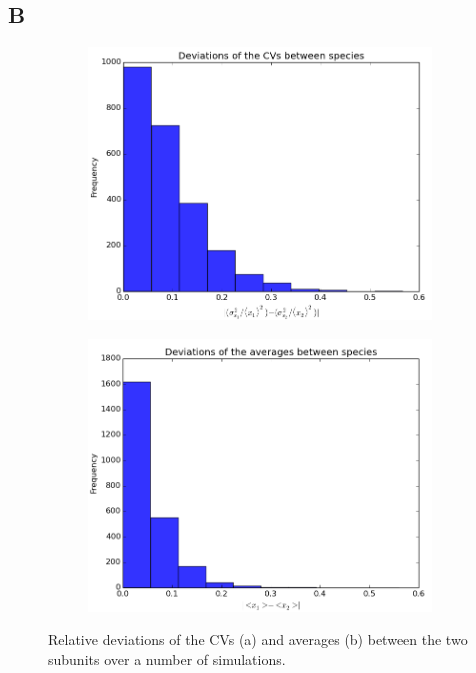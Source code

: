 \documentclass[a4paper,12pt]{article}
\begin{document}
\subsection*{B}
\begin{figure}[!ht]
        \centering
        \begin{subfigure}[!ht]{0.7\textwidth}
                \includegraphics[width=\textwidth]{images/vars_devs}
                \caption{}
                \label{fig:devs_vars}
        \end{subfigure}%
        
        \begin{subfigure}[b]{0.7\textwidth}
                \includegraphics[width=\textwidth]{images/avgs_devs}
                \caption{}
                \label{fig:devs_avgs}
        \end{subfigure}
        
\caption{Relative deviations of the CVs (a) and averages (b) between the two subunits over a number of simulations.}
\label{fig:dev_hists}
\end{figure}
\end{document}
